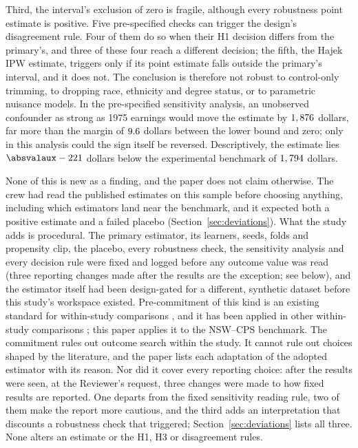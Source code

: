 \documentclass[11pt]{article}
\def\absvalaux-#1\relax{#1}
\newcommand{\absval}[1]{\expandafter\absvalaux#1\relax}
\begin{document}
Third, the interval's exclusion of zero is fragile, although every robustness point
estimate is positive. Five pre-specified checks can trigger the design's disagreement rule.
Four of them do so when their H1 decision differs from the primary's, and three of these
four reach a different decision; the fifth, the Hajek IPW estimate, triggers only if its
point estimate falls outside the primary's interval, and it does not. The conclusion is
therefore not robust to control-only trimming, to dropping race, ethnicity and degree status, or to
parametric nuisance models. In the pre-specified sensitivity analysis, an unobserved
confounder as strong as 1975 earnings would move the estimate by $1,876$
dollars, far more than the margin of $9.6$ dollars between the lower bound and
zero; only in this analysis could the sign itself be reversed. Descriptively, the estimate lies $\absval{\HTwoDiff}$ dollars below the experimental
benchmark of $1,794$ dollars.

None of this is new as a finding, and the paper does not claim otherwise. The crew had read
the published estimates on this sample before choosing anything, including which estimators
land near the benchmark, and it expected both a positive estimate and a failed placebo
(Section~\ref{sec:deviations}). What the study adds is procedural. The primary estimator, its
learners, seeds, folds and propensity clip, the placebo, every robustness check, the
sensitivity analysis and every decision rule were fixed and logged before any outcome value
was read (three reporting changes made after the results are the exception; see below), and
the estimator itself had been design-gated for a different, synthetic dataset
before this study's workspace existed. Pre-commitment of this kind is an existing standard
for within-study comparisons \citep{cook2008}, and it has been applied in other within-study comparisons
\citep{weidmann2021,keller2024}; this paper applies it to the NSW--CPS benchmark. The
commitment rules out outcome search within the study. It cannot rule out choices shaped by
the literature, and the paper lists each adaptation of the adopted estimator with its
reason. Nor did it cover every reporting choice: after the results were seen, at the
Reviewer's request, three changes were made to how fixed results are reported. One departs
from the fixed sensitivity reading rule, two of them make the report more cautious, and the
third adds an interpretation that discounts a robustness check that triggered;
Section~\ref{sec:deviations} lists all three. None alters an estimate or the H1, H3 or
disagreement rules.
\end{document}
